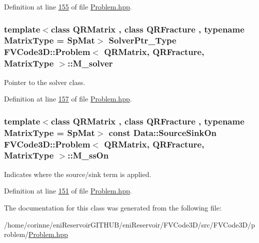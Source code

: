 Definition at line \hyperlink{Problem_8hpp_source_l00155}{155} of file \hyperlink{Problem_8hpp_source}{Problem.\+hpp}.

\subsubsection[{\texorpdfstring{M\+\_\+solver}{M_solver}}]{\setlength{\rightskip}{0pt plus 5cm}template$<$class Q\+R\+Matrix , class Q\+R\+Fracture , typename Matrix\+Type  = Sp\+Mat$>$ {\bf Solver\+Ptr\+\_\+\+Type} {\bf F\+V\+Code3\+D\+::\+Problem}$<$ Q\+R\+Matrix, Q\+R\+Fracture, Matrix\+Type $>$\+::M\+\_\+solver\hspace{0.3cm}{\ttfamily [protected]}}\hypertarget{classFVCode3D_1_1Problem_a0dca07f85c16083308d98f518685e3e9}{}\label{classFVCode3D_1_1Problem_a0dca07f85c16083308d98f518685e3e9}


Pointer to the solver class. 



Definition at line \hyperlink{Problem_8hpp_source_l00157}{157} of file \hyperlink{Problem_8hpp_source}{Problem.\+hpp}.

\subsubsection[{\texorpdfstring{M\+\_\+ss\+On}{M_ssOn}}]{\setlength{\rightskip}{0pt plus 5cm}template$<$class Q\+R\+Matrix , class Q\+R\+Fracture , typename Matrix\+Type  = Sp\+Mat$>$ const {\bf Data\+::\+Source\+Sink\+On} {\bf F\+V\+Code3\+D\+::\+Problem}$<$ Q\+R\+Matrix, Q\+R\+Fracture, Matrix\+Type $>$\+::M\+\_\+ss\+On\hspace{0.3cm}{\ttfamily [protected]}}\hypertarget{classFVCode3D_1_1Problem_ab6c92913d3fda97fa741eb2ebfa01fe6}{}\label{classFVCode3D_1_1Problem_ab6c92913d3fda97fa741eb2ebfa01fe6}


Indicates where the source/sink term is applied. 



Definition at line \hyperlink{Problem_8hpp_source_l00151}{151} of file \hyperlink{Problem_8hpp_source}{Problem.\+hpp}.



The documentation for this class was generated from the following file\+:\begin{DoxyCompactItemize}
\item 
/home/corinne/eni\+Reservoir\+G\+I\+T\+H\+U\+B/eni\+Reservoir/\+F\+V\+Code3\+D/src/\+F\+V\+Code3\+D/problem/\hyperlink{Problem_8hpp}{Problem.\+hpp}\end{DoxyCompactItemize}
